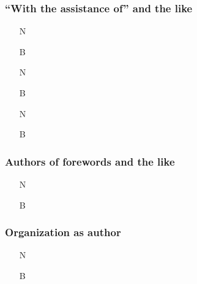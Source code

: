 \documentclass[11pt,letterpaper,oneside]{article}
\begin{document}
\subsubsection{``With the assistance of'' and the like}


\begin{itemize}
\item[N] 

\item[B] 

\item[N] 

\item[B] 

\item[N] 

\item[B] 
\end{itemize}

\setcounter{subsubsection}{90}
\subsubsection{Authors of forewords and the like}

\begin{itemize}
\item[N] 

\item[B] 
\end{itemize}

\subsubsection{Organization as author}


\begin{itemize}
\item[N] 

\item[B] 
\end{itemize}
\end{document}
